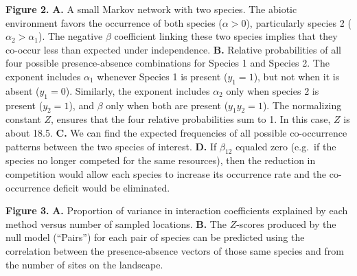 \documentclass[12pt,]{article}
\begin{document}
\begin{spacing}{1.9}
\begin{flushleft}
\textbf{Figure 2.} \textbf{A.} A small Markov network with two species.
The abiotic environment favors the occurrence of both species
(\(\alpha >0\)), particularly species 2 (\(\alpha_2 > \alpha_1\)). The
negative \(\beta\) coefficient linking these two species implies that
they co-occur less than expected under independence. \textbf{B.}
Relative probabilities of all four possible presence-absence
combinations for Species 1 and Species 2. The exponent includes
\(\alpha_1\) whenever Species 1 is present (\(y_1 = 1\)), but not when
it is absent (\(y_1 = 0\)). Similarly, the exponent includes
\(\alpha_2\) only when species \(2\) is present (\(y_2 = 1\)), and
\(\beta\) only when both are present (\(y_1y_2 = 1\)). The normalizing
constant \(Z\), ensures that the four relative probabilities sum to 1.
In this case, \(Z\) is about 18.5. \textbf{C.} We can find the expected
frequencies of all possible co-occurrence patterns between the two
species of interest. \textbf{D.} If \(\beta_{12}\) equaled zero (e.g.~if
the species no longer competed for the same resources), then the
reduction in competition would allow each species to increase its
occurrence rate and the co-occurrence deficit would be eliminated.

\textbf{Figure 3.} \textbf{A.} Proportion of variance in interaction
coefficients explained by each method versus number of sampled
locations. \textbf{B.} The \(Z\)-scores produced by the null model
(``Pairs'') for each pair of species can be predicted using the
correlation between the presence-absence vectors of those same species
and from the number of sites on the landscape.

\end{flushleft}
\end{spacing}
\end{document}
